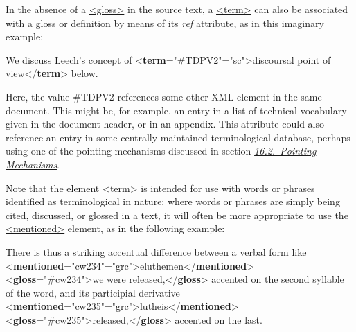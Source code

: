 In the absence of a \hyperref[TEI.gloss]{<gloss>} in the source text, a \hyperref[TEI.term]{<term>} can also be associated with a gloss or definition by means of its {\itshape ref} attribute, as in this imaginary example: \par\bgroup{}\exampleFont \begin{shaded}\noindent\mbox{}We discuss Leech's concept of {<\textbf{term}\hspace*{1em}{ref}="{\#TDPV2}"\hspace*{1em}{rend}="{sc}">}discoursal point of view{</\textbf{term}>} below. \end{shaded}\egroup\par \noindent  Here, the value \textsf{\#TDPV2} references some other XML element in the same document. This might be, for example, an entry in a list of technical vocabulary given in the document header, or in an appendix. This attribute could also reference an entry in some centrally maintained terminological database, perhaps using one of the pointing mechanisms discussed in section \textit{\hyperref[SAXP]{16.2.\ Pointing Mechanisms}}.\par
Note that the element \hyperref[TEI.term]{<term>} is intended for use with words or phrases identified as terminological in nature; where words or phrases are simply being cited, discussed, or glossed in a text, it will often be more appropriate to use the \hyperref[TEI.mentioned]{<mentioned>} element, as in the following example: \par\bgroup{}\exampleFont \begin{shaded}\noindent\mbox{}There is thus a striking accentual difference between a verbal\mbox{}\newline 
 form like {<\textbf{mentioned}\hspace*{1em}{xml:id}="{cw234}"\hspace*{1em}{xml:lang}="{grc}">}eluthemen{</\textbf{mentioned}>}\mbox{}\newline 
{<\textbf{gloss}\hspace*{1em}{target}="{\#cw234}">}we were released,{</\textbf{gloss}>} accented on the\mbox{}\newline 
 second syllable of the word, and its participial derivative\mbox{}\newline 
\mbox{}\newline 
{<\textbf{mentioned}\hspace*{1em}{xml:id}="{cw235}"\hspace*{1em}{xml:lang}="{grc}">}lutheis{</\textbf{mentioned}>}\mbox{}\newline 
{<\textbf{gloss}\hspace*{1em}{target}="{\#cw235}">}released,{</\textbf{gloss}>} accented on the last.\end{shaded}\egroup\par \par

